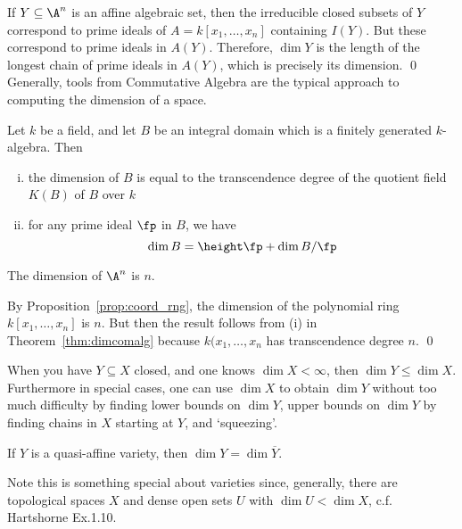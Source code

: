\pf If $Y \subseteq \A^n$ is an affine algebraic set, then the irreducible closed subsets of $Y$ correspond to prime ideals of $A= k[x_1,\ldots,x_n]$ containing $I(Y)$. But these correspond to prime ideals in $A(Y)$. Therefore, $\dim Y$ is the length of the longest chain of prime ideals in $A(Y)$, which is precisely its dimension. \qed \\


Generally, tools from Commutative Algebra are the typical approach to computing the dimension of a space. 


\begin{thm} \label{thm:dimcomalg}
Let $k$ be a field, and let $B$ be an integral domain which is a finitely generated $k$-algebra. Then
	\begin{enumerate}[(i)]
	\item the dimension of $B$ is equal to the  transcendence degree of the quotient field $K(B)$ of $B$ over $k$
	\item for any prime ideal $\fp$ in $B$, we have
		\[
		\dim B= \height \fp + \dim B/\fp
		\]
	\end{enumerate}
\end{thm}


\begin{prop}
The dimension of $\A^n$ is $n$.
\end{prop}

\pf By Proposition~\ref{prop:coord_rng}, the dimension of the polynomial ring $k[x_1,\ldots,x_n]$ is $n$. But then the result follows from (i) in Theorem~\ref{thm:dimcomalg} because $k(x_1,\ldots,x_n$ has transcendence degree $n$. \qed \\


\begin{rem}
When you have $Y \subseteq X$ closed, and one knows $\dim X < \infty$, then $\dim Y \leq \dim X$. Furthermore in special cases, one can use $\dim X$ to obtain $\dim Y$ without too much difficulty by finding lower bounds on $\dim Y$, upper bounds on $\dim Y$ by finding chains in $X$ starting at $Y$, and `squeezing'. 
\end{rem}


\begin{prop}
If $Y$ is a quasi-affine variety, then $\dim Y= \dim \overline{Y}$.
\end{prop}



Note this is something special about varieties since, generally, there are topological spaces $X$ and dense open sets $U$ with $\dim U < \dim X$, c.f. Hartshorne Ex.1.10. 



